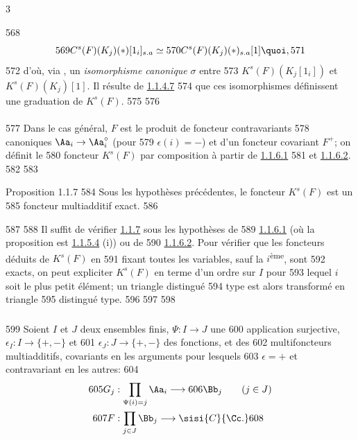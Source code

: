 3	\documentclass[10pt]{../fichiers-configuration-latex/smfart}
\begin{document}
   568	\[
   569	C^{s}(F)(K_j)(\ast)[1_i]_{s.a}\simeq
   570	C^{s}(F)(K_j)(\ast)_{s.a}[1]{\quoi},
   571	\]
   572	d'où, via , un \emph{isomorphisme canonique} $\sigma$ entre
   573	$K^{s}(F)(K_{j}[1_i])$ et $K^{s}(F)(K_{j})[1]$. Il résulte de \hyperref[XVII.par1.1.4.7]{1.1.4.7}
   574	que ces isomorphismes définissent une graduation de $K^{s}(F)$.
   575	
   576	\paragraph{}
   577	Dans le cas général, $F$ est le produit de foncteur contravariants
   578	canoniques $\Aa_i\rightarrow \Aa^{\circ}_i$ (pour
   579	$\epsilon(i)=-$) et d'un foncteur covariant $F^{+}$; on définit le
   580	foncteur $K^{s}(F)$ par composition à partir de \hyperref[XVII.par1.1.6.1]{1.1.6.1}
   581	et \hyperref[XVII.par1.1.6.2]{1.1.6.2}.
   582	
   583	\begin{enonce*}{Proposition 1.1.7}
   584	Sous les hypothèses précédentes, le foncteur $K^{s}(F)$ est un
   585	foncteur multiadditif exact.
   586	\end{enonce*}
   587	
   588	Il suffit de vérifier \hyperref[XVII.prop1.1.7]{1.1.7} sous les hypothèses de
   589	\hyperref[XVII.par1.1.6.1]{1.1.6.1} (où la proposition est \hyperref[XVII.lem1.1.5.4]{1.1.5.4} (i)) ou de
   590	\hyperref[XVII.par1.1.6.2]{1.1.6.2}. Pour vérifier que les foncteurs déduits de $K^{s}(F)$ en
   591	fixant toutes les variables, sauf la $i$\textsuperscript{ème}, sont
   592	exacts, on peut expliciter $K^{s}(F)$ en terme d'un ordre sur $I$ pour
   593	lequel $i$ soit le plus petit élément; un triangle distingué
   594	type\pageoriginale {} est alors transformé en triangle
   595	distingué type.
   596	
   597	\setcounter{subsubsection}{7}
   598	\subsubsection{}
   599	Soient $I$ et $J$ deux ensembles finis, $\Psi:I\rightarrow J$ une
   600	application surjective, $\epsilon_{I}:I\rightarrow \{+,-\}$ et
   601	$\epsilon_{J}:J\rightarrow \{+,-\}$ des fonctions, et des
   602	multifoncteurs multiadditifs, covariants en les arguments pour lesquels
   603	$\epsilon =+$ et contravariant en les autres:
   604	\begin{align*}
   605	G_j&: \prod_{\Psi(i)=j}\Aa_i\longrightarrow
   606	\Bb_j\qquad (j\in J)\\
   607	F&:  \prod_{j\in J} \Bb_j\longrightarrow \sisi{C}{\Cc.}
   608	\end{align*}
\end{document}
